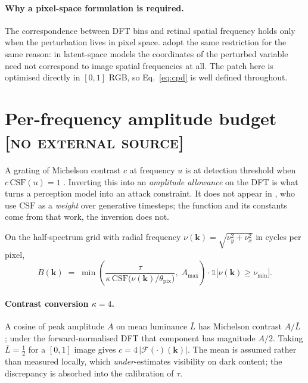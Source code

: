 \documentclass[11pt,a4paper]{article}
\newcommand{\novel}{\hfill{\normalfont\small\textsc{[no external source]}}}
\begin{document}
\paragraph{Why a pixel-space formulation is required.}
The correspondence between DFT bins and retinal spatial frequency holds
only when the perturbation lives in pixel space.
\citet[Sec.~5.1]{galinska2026csflow} adopt the same restriction for the
same reason: in latent-space models the coordinates of the perturbed
variable need not correspond to image spatial frequencies at all. The
patch here is optimised directly in $[0,1]$ RGB, so Eq.~\eqref{eq:cpd}
is well defined throughout.

\section{Per-frequency amplitude budget \novel}

A grating of Michelson contrast $c$ at frequency $u$ is at detection
threshold when $c\,\mathrm{CSF}(u)=1$ \citep{barten2003}. Inverting this
into an \emph{amplitude allowance} on the DFT is what turns a perception
model into an attack constraint. It does not appear in
\citet{galinska2026csflow}, who use $\mathrm{CSF}$ as a \emph{weight}
over generative timesteps; the function and its constants come from that
work, the inversion does not.

On the half-spectrum grid with radial frequency
$\nu(\mathbf{k})=\sqrt{\nu_y^2+\nu_x^2}$ in cycles per pixel,
\begin{equation}
  B(\mathbf{k}) \;=\;
  \min\!\left(\frac{\tau}{\kappa\,\mathrm{CSF}\big(\nu(\mathbf{k})/\theta_{\mathrm{pix}}\big)},
  \;A_{\max}\right)\cdot\mathbb{1}\big[\nu(\mathbf{k})\ge\nu_{\min}\big].
  \label{eq:budget}
\end{equation}

\paragraph{Contrast conversion $\kappa=4$.}
A cosine of peak amplitude $A$ on mean luminance $\bar{L}$ has Michelson
contrast $A/\bar{L}$ \citep{michelson1927}; under the forward-normalised
DFT that component has magnitude $A/2$. Taking $\bar{L}=\tfrac12$ for a
$[0,1]$ image gives $c=4\,|\mathcal{F}(\cdot)(\mathbf{k})|$. The mean is
assumed rather than measured locally, which \emph{under}-estimates
visibility on dark content; the discrepancy is absorbed into the
calibration of $\tau$.
\end{document}
